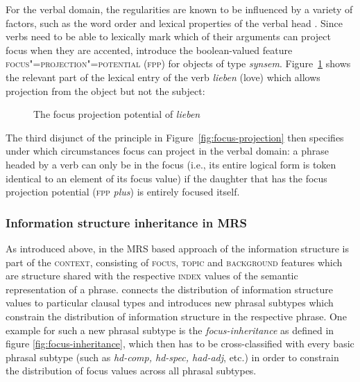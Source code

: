 \documentclass[output=paper]{langsci/langscibook}
\begin{document}
For the verbal domain, the regularities are known to be influenced by
a variety of factors, such as the word order and lexical properties of
the verbal head \citep[cf., e.g., ][]{vSU86a}.  Since verbs
need to be able to lexically mark which of their arguments can project
focus when they are accented, \cite{dKM2003a} introduce the boolean-valued feature
\textsc{focus"=projection"=potential (fpp)} for objects of type
\textit{synsem}.  Figure~\ref{fig:fpp-lieben} shows the relevant part
of the lexical entry of the verb \textit{lieben} (love) which allows
projection from the object but not the subject:
\begin{figure}[htb!]

\begin{center}
  \begin{avm}
  \end{avm}
\caption{The focus projection potential of \textit{lieben}}
\label{fig:fpp-lieben}
\end{center}\unskip
\end{figure}

The third disjunct of the principle in
Figure~\ref{fig:focus-projection} then specifies under which circumstances
focus can project in the verbal domain: a phrase headed by a verb can
only be in the focus (i.e., its entire logical form is token identical
to an element of its focus value) if the daughter that has the focus
projection potential (\textsc{fpp} \textit{plus}) is entirely focused
itself.


\subsubsection{Information structure inheritance in MRS}

As introduced above, in the MRS based approach of \cite{Paggio2009a-u} the
information structure is part of the \textsc{context}, consisting of
\textsc{focus}, \textsc{topic} and \textsc{background} features which
are structure shared with the respective \textsc{index} values of the
semantic representation of a phrase. \cite{Paggio2009a-u} connects the
distribution of information structure values to particular clausal
types and introduces new phrasal subtypes which constrain the
distribution of information structure in the respective phrase. One
example for such a new phrasal subtype is the
\textit{focus-inheritance} as defined in figure
\ref{fig:focus-inheritance}, which then has to be cross-classified
with every basic phrasal subtype (such as \textit{hd-comp, hd-spec,
  had-adj}, etc.) in order to constrain the distribution of focus
values across all phrasal subtypes.
\end{document}
